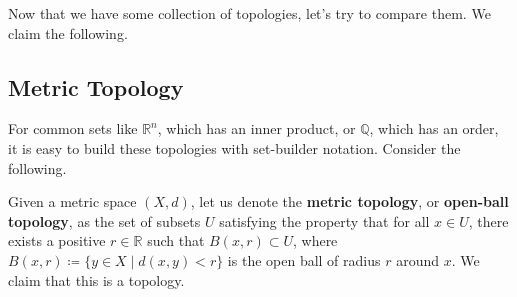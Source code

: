   Now that we have some collection of topologies, let's try to compare them. We claim the following. 

  \begin{theorem}
    
  \end{theorem}

\subsection{Metric Topology}

  For common sets like $\mathbb{R}^n$, which has an inner product, or $\mathbb{Q}$, which has an order, it is easy to build these topologies with set-builder notation. Consider the following. 

  \begin{definition}
    Given a metric space $(X, d)$, let us denote the \textbf{metric topology}, or \textbf{open-ball topology}, as the set of subsets $U$ satisfying the property that for all $x \in U$, there exists a positive $r \in \mathbb{R}$ such that $B(x, r) \subset U$, where $B(x, r) \coloneqq \{y \in X \mid d(x, y) < r\}$ is the open ball of radius $r$ around $x$. We claim that this is a topology. 
  \end{definition} 
